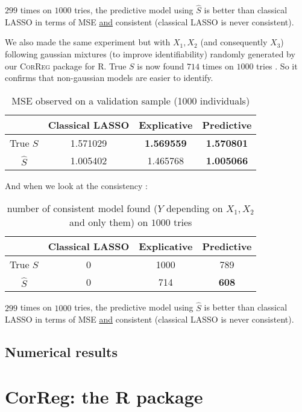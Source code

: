 \documentclass[11pt,a4paper]{report}
\begin{document}
		$299$ times on $1000$ tries, the predictive model using $\hat{S}$ is better than classical LASSO in terms of MSE \underline{and} consistent (classical LASSO is never consistent).
		
		We also made the same experiment but with $X_1,X_2$ (and consequently $X_3$) following gaussian mixtures (to improve identifiability) randomly generated by our \textsc{CorReg} package for R. 
		True $S$ is now found $714$ times on $1000$ tries \label{testidentifiable}. So it confirms that non-gaussian models are easier to identify.
		
		
		\begin{table}[h!]
		\centering
		\begin{tabular}{|c|c|c|c|}
		\hline 
		 & Classical LASSO & Explicative & Predictive \\ 
		\hline 
		True $S$ &  1.571029 & \textbf{1.569559} & \textbf{1.570801} \\ 
		\hline 
		$\hat{S}$ & 1.005402 & 1.465768 & \textbf{1.005066} \\ 
		\hline 
		\end{tabular} 
		\caption{MSE observed on a validation sample (1000 individuals)}
		\end{table}

		And when we look at the consistency :
		\begin{table}[h!]
		\centering	
		\begin{tabular}{|c|c|c|c|}
		\hline 
		 & Classical LASSO & Explicative & Predictive \\ 
		\hline 
		True $S$ &  0 & 1000 & 789 \\ 
		\hline 
		$\hat{S}$ & 0 & 714 & \textbf{608} \\ 
		\hline 
		\end{tabular} 
		\caption{number of consistent model found ($Y$ depending on $X_1,X_2$ and only them) on $1000$ tries}
		\end{table}				
				
		
		$299$ times on $1000$ tries, the predictive model using $\hat{S}$ is better than classical LASSO in terms of MSE \underline{and} consistent (classical LASSO is never consistent).
		

	\section{Numerical results}

\chapter{CorReg: the R package}	
	
\end{document}
